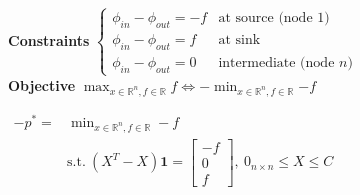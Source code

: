 \documentclass[a4paper]{article}
\begin{document}
\begin{multicols}{2}
    \textbf{Constraints}   $\begin{cases}
        \phi_{in}-\phi_{out}=-f&\text{at source (node 1)}\\
        \phi_{in}-\phi_{out}=f&\text{at sink}\\
        \phi_{in}-\phi_{out}=0&\text{intermediate (node $n$)}
    \end{cases}$\\   
    \textbf{Objective} $\max_{x\in\mathbb{R}^n, f\in\mathbb{R}}{f} \iff -\min_{x\in\mathbb{R}^n, f\in\mathbb{R}}{-f}$
    \begin{center}
        $\begin{aligned}
            -p^*=&\min_{x\in\mathbb{R}^n, f\in\mathbb{R}} -f\\
            &\text{s.t.} \ (X^T-X)\mathbf{1}=\begin{bmatrix}
                -f\\0\\f
            \end{bmatrix}, \ 0_{n\times{n}} \le X \le C
        \end{aligned}$
    \end{center}
\end{multicols}
\end{document}
